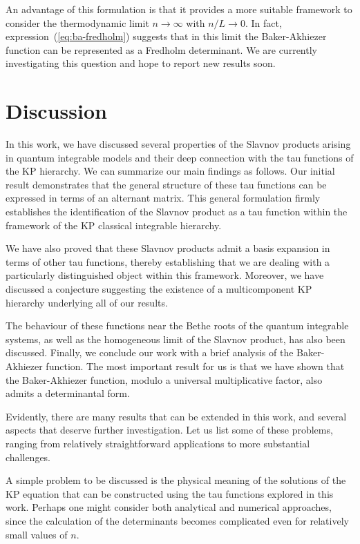 \documentclass[a4paper,12pt]{amsart}
\begin{document}
An advantage of this formulation is that it provides a more suitable
framework to consider the thermodynamic limit \(n \to \infty\) with
\(n/L \to 0\). In fact, expression~(\ref{eq:ba-fredholm}) suggests
that in this limit the Baker-Akhiezer function can be represented as a
Fredholm determinant. We are currently investigating this question and
hope to report new results soon.



\section{Discussion}

In this work, we have discussed several properties of the Slavnov
products arising in quantum integrable models and their deep
connection with the tau functions of the KP hierarchy. We can
summarize our main findings as follows. Our initial result
demonstrates that the general structure of these tau functions can be
expressed in terms of an alternant matrix. This general formulation
firmly establishes the identification of the Slavnov product as a tau
function within the framework of the KP classical integrable hierarchy.

We have also proved that these Slavnov products admit a basis
expansion in terms of other tau functions, thereby establishing that
we are dealing with a particularly distinguished object within this
framework. Moreover, we have discussed a conjecture suggesting the
existence of a multicomponent KP hierarchy underlying all of our
results.

The behaviour of these functions near the Bethe roots of the quantum
integrable systems, as well as the homogeneous limit of the Slavnov
product, has also been discussed. Finally, we conclude our work with a
brief analysis of the Baker-Akhiezer function. The most important
result for us is that we have shown that the Baker-Akhiezer function,
modulo a universal multiplicative factor, also admits a determinantal
form.

Evidently, there are many results that can be extended in this work,
and several aspects that deserve further investigation. Let us list
some of these problems, ranging from relatively straightforward
applications to more substantial challenges.

A simple problem to be discussed is the physical meaning of the
solutions of the KP equation that can be constructed using the tau
functions explored in this work. Perhaps one might consider both
analytical and numerical approaches, since the calculation of the
determinants becomes complicated even for relatively small values of
\(n\).
\end{document}
